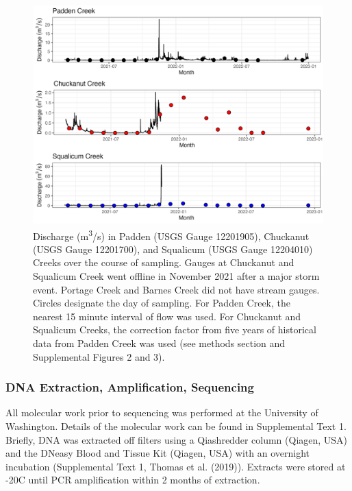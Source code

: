 \documentclass[
]{article}
\begin{document}
\begin{figure}
\centering
\includegraphics{../Output/Figures/flow_gauges.png}
\caption{Discharge (m\textsuperscript{3}/s) in Padden (USGS Gauge
12201905), Chuckanut (USGS Gauge 12201700), and Squalicum (USGS Gauge
12204010) Creeks over the course of sampling. Gauges at Chuckanut and
Squalicum Creek went offline in November 2021 after a major storm event.
Portage Creek and Barnes Creek did not have stream gauges. Circles
designate the day of sampling. For Padden Creek, the nearest 15 minute
interval of flow was used. For Chuckanut and Squalicum Creeks, the
correction factor from five years of historical data from Padden Creek
was used (see methods section and Supplemental Figures 2 and
3).\label{fig:flows}}
\end{figure}

\hypertarget{dna-extraction-amplification-sequencing}{%
\subsubsection{DNA Extraction, Amplification,
Sequencing}\label{dna-extraction-amplification-sequencing}}

All molecular work prior to sequencing was performed at the University
of Washington. Details of the molecular work can be found in
Supplemental Text 1. Briefly, DNA was extracted off filters using a
Qiashredder column (Qiagen, USA) and the DNeasy Blood and Tissue Kit
(Qiagen, USA) with an overnight incubation (Supplemental Text 1, Thomas
et al. (2019)). Extracts were stored at -20\degree C until PCR
amplification within 2 months of extraction.
\end{document}
